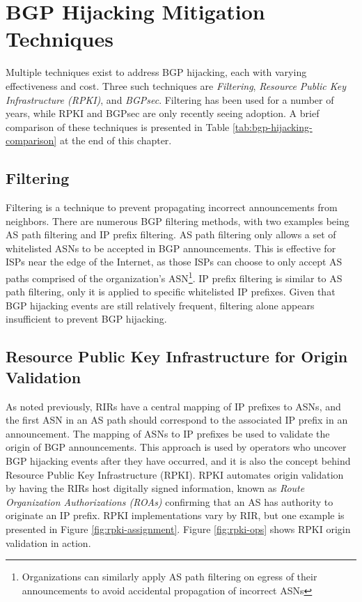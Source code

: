 \documentclass[conference]{IEEEtran}
\begin{document}
\section{BGP Hijacking Mitigation Techniques}
Multiple techniques exist to address BGP hijacking, each with varying effectiveness and cost.  Three such techniques are \emph{Filtering}, \emph{Resource Public Key Infrastructure (RPKI)}, and \emph{BGPsec}.  Filtering has been used for a number of years, while RPKI and BGPsec are only recently seeing adoption.  A brief comparison of these techniques is presented in Table \ref{tab:bgp-hijacking-comparison} at the end of this chapter.

\subsection{Filtering}
Filtering is a technique to prevent propagating incorrect announcements from neighbors.  There are numerous BGP filtering methods, with two examples being AS path filtering and IP prefix filtering.  AS path filtering only allows a set of whitelisted ASNs to be accepted in BGP announcements.  This is effective for ISPs near the edge of the Internet, as those ISPs can choose to only accept AS paths comprised of the organization's ASN\footnote{Organizations can similarly apply AS path filtering on egress of their announcements to avoid accidental propagation of incorrect ASNs}.  IP prefix filtering is similar to AS path filtering, only it is applied to specific whitelisted IP prefixes.  Given that BGP hijacking events are still relatively frequent, filtering alone appears insufficient to prevent BGP hijacking.

\subsection{Resource Public Key Infrastructure for Origin Validation}
As noted previously, RIRs have a central mapping of IP prefixes to ASNs, and the first ASN in an AS path should correspond to the associated IP prefix in an announcement.  The mapping of ASNs to IP prefixes be used to validate the origin of BGP announcements.  This approach is used by operators who uncover BGP hijacking events after they have occurred, and it is also the concept behind Resource Public Key Infrastructure (RPKI).  RPKI automates origin validation by having the RIRs host digitally signed information, known as \emph{Route Organization Authorizations (ROAs)} confirming that an AS has authority to originate an IP prefix.  RPKI implementations vary by RIR, but one example is presented in Figure \ref{fig:rpki-assignment}.  Figure \ref{fig:rpki-ops} shows RPKI origin validation in action.
\end{document}
